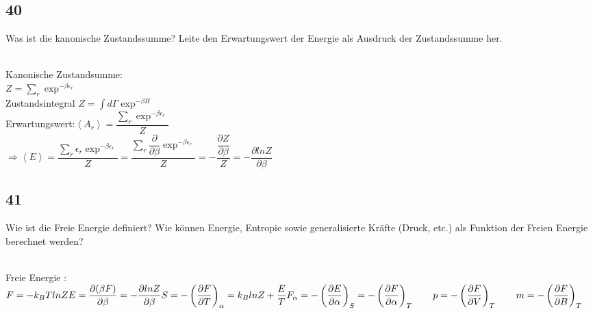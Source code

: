 \subsection{40}
\begin{myfrag}
Was ist die kanonische Zustandssumme? Leite den Erwartungswert der Energie
als Ausdruck der Zustandssumme her.
\end{myfrag} \quad \\
Kanonische Zustandsumme: \\
$ Z= \sum \limits_r \exp ^{-\beta \epsilon _r} $ \quad \\ Zustandsintegral  $Z = \int d \Gamma \exp ^{-\beta H} $ \\[1ex]
Erwartungswert:$ \left\langle A_r \right\rangle = \dfrac{\sum _r \exp ^{-\beta \epsilon _r}}{Z}$ \\[1ex]
$\Rightarrow \left\langle E \right\rangle = \dfrac{\sum _r \epsilon _r \exp ^{-\beta \epsilon _r}}{Z} = \dfrac{\sum _r \dfrac{\partial}{\partial \beta} \exp ^{-\beta \epsilon _r}}{Z} = -\dfrac{\dfrac{\partial Z}{\partial \beta}}{Z} = - \dfrac{\partial lnZ}{\partial \beta}$
\subsection{41}
\begin{myfrag}
Wie ist die Freie Energie definiert? Wie können Energie, Entropie sowie
generalisierte Kräfte (Druck, etc.) als Funktion der Freien Energie berechnet
werden?
\end{myfrag} \quad \\
Freie Energie : $ F = -k_B T lnZ \\[1ex]
E = \dfrac{\partial (\beta F)}{\partial \beta } = - \dfrac{\partial lnZ}{\partial \beta } \\[1ex]
S= - \left( \dfrac{\partial F}{\partial T} \right) _\alpha = k_BlnZ + \dfrac{E}{T} \\[1ex]
F_\alpha =- \left( \dfrac{\partial E}{\partial \alpha } \right)_S = - \left( \dfrac{\partial F}{\partial \alpha } \right) _T \qquad p = - \left( \dfrac{\partial F}{\partial V} \right)_T \qquad m= - \left( \dfrac{\partial F}{\partial B} \right)_T$ 
